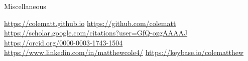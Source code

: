 
\begin{rubric}{Miscellaneous}

  
   \url{https://colematt.github.io}
   \url{https://github.com/colematt}
   \url{https://scholar.google.com/citations?user=GfQ-ozgAAAAJ}
   \url{https://orcid.org/0000-0003-1743-1504}
   \url{https://www.linkedin.com/in/matthewcole4/}
   \url{https://keybase.io/colematthew}

\end{rubric}
